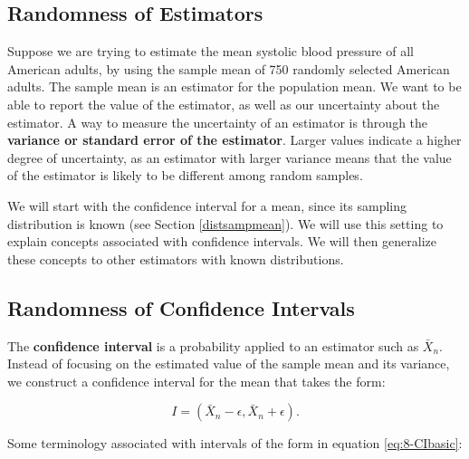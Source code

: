 \documentclass[
]{book}
\theoremstyle{definition}
\theoremstyle{definition}
\theoremstyle{definition}
\theoremstyle{definition}
\theoremstyle{remark}
\begin{document}
\hypertarget{randomness-of-estimators}{%
\subsection{Randomness of Estimators}\label{randomness-of-estimators}}

Suppose we are trying to estimate the mean systolic blood pressure of all American adults, by using the sample mean of 750 randomly selected American adults. The sample mean is an estimator for the population mean. We want to be able to report the value of the estimator, as well as our uncertainty about the estimator. A way to measure the uncertainty of an estimator is through the \textbf{variance or standard error of the estimator}. Larger values indicate a higher degree of uncertainty, as an estimator with larger variance means that the value of the estimator is likely to be different among random samples.

We will start with the confidence interval for a mean, since its sampling distribution is known (see Section \ref{distsampmean}). We will use this setting to explain concepts associated with confidence intervals. We will then generalize these concepts to other estimators with known distributions.

\hypertarget{randomness-of-confidence-intervals}{%
\subsection{Randomness of Confidence Intervals}\label{randomness-of-confidence-intervals}}

The \textbf{confidence interval} is a probability applied to an estimator such as \(\bar{X}_n\). Instead of focusing on the estimated value of the sample mean and its variance, we construct a confidence interval for the mean that takes the form:

\begin{equation} 
I = \left(\bar{X}_n - \epsilon, \bar{X}_n + \epsilon \right).
\label{eq:8-CIbasic}
\end{equation}

Some terminology associated with intervals of the form in equation \eqref{eq:8-CIbasic}:
\end{document}
